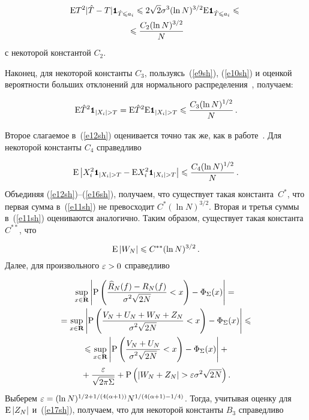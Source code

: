 \begin{multicols}{2}
\noindent
\begin{multline}
\mbox{E}T^2|\hat{T}-T|\mbox{{\small \tt {1}}\hspace{-1.5mm}{\tt 1}}_{\hat{T}\leqslant 
a_i}\leqslant2\sqrt{2}\sigma^3(\ln N)^{{3}/{2}}\mbox{E}\mbox{{\small \tt {1}}\hspace{-1.5mm}{\tt 1}}_{\hat{T}\leqslant 
a_i}\leqslant{}\\
{}\leqslant\displaystyle\frac{\displaystyle C_2(\ln N)^{{3}/{2}}\mathstrut}{\displaystyle N\mathstrut}\label{e14sh}
\end{multline}
с некоторой константой $C_2$.

Наконец, для некоторой константы $C_3$, пользуясь~(\ref{e9sh}), (\ref{e10sh}) 
и оценкой вероятности больших отклонений для нормального распределения~\cite{18sh}, получаем:

\noindent
\begin{equation}
\mbox{E}\hat{T}^2\Ik_{|X_i|> T}=\mbox{E}\hat{T}^2\mbox{E}\Ik_{|X_i|> T}\leqslant
\fr{C_3(\ln N)^{{1}/{2}}}{N}\,.\label{e15sh}
\end{equation}

Второе слагаемое в~(\ref{e12sh}) оценивается точно так же, как в работе~\cite{8sh}. 
Для некоторой константы $C_4$ справедливо

\noindent
\begin{equation}
\mbox{E}\abs{X_i^2\Ik_{|X_i|> T}-\mbox{E}X_i^2\Ik_{|X_i|> T}}\leqslant
\fr{C_4(\ln N)^{{1}/{2}}}{N}\,.\label{e16sh}
\end{equation}
Объединяя (\ref{e12sh})--(\ref{e16sh}), получаем, что существует такая константа~$C^*$, 
что первая сумма в~(\ref{e11sh}) не превосходит $C^*(\ln N)^{{3}/{2}}$. Вторая и 
третья суммы в~(\ref{e11sh}) оцениваются аналогично. Таким образом, существует такая 
константа $C^{**}$, что

\noindent
\begin{equation}
\mbox{E}\left\vert W_N\right\vert\leqslant C^{**}(\ln N)^{{3}/{2}}\,.\label{e17sh}
\end{equation}
Далее, для произвольного $\eps\hm>0$ справедливо

\noindent
\begin{multline*}
\sup\limits_{x\in\mathbf{R}}\left\vert\mbox{P}\left(\displaystyle\frac{\displaystyle \widehat{R}_N(f)-R_N(f)\mathstrut}{\displaystyle \sigma^2\sqrt{2N}\mathstrut}<x\right)-
\Phi_\Sigma(x)\right\vert={}\\
{}=\sup\limits_{x\in\mathbf{R}}\left\vert\mbox{P}
\left(\displaystyle\frac{\displaystyle V_N+U_N+W_N+Z_N\mathstrut}{\displaystyle \sigma^2\sqrt{2N}\mathstrut}<x\right)-\Phi_\Sigma(x)\right\vert\leqslant{}\hspace*{-0.7pt}\\
{}\leqslant\sup\limits_{x\in\mathbf{R}}\left\vert\mbox{P}\left(
\displaystyle\frac{\displaystyle V_N+U_N\mathstrut}{\displaystyle \sigma^2\sqrt{2N}\mathstrut}<x\right)- \Phi_\Sigma(x)\right\vert+{}\\
{}+\displaystyle\frac{\displaystyle \varepsilon\mathstrut}{\displaystyle \sqrt{2\pi\Sigma}\mathstrut}+
\mbox{P}\left(\left\vert W_N+Z_N\right\vert>\varepsilon\sigma^2\sqrt{2N}\right).
\end{multline*}
Выберем $\varepsilon=(\ln N)^{{1}/{2}+{1}/(4(\alpha+1))}N^{{1}/(4(\alpha+1)-{1}/{4})}$. 
Тогда, учитывая оценку для $\mbox{E}\left\vert Z_N\right\vert$ и~(\ref{e17sh}), 
получаем, что для некоторой константы $B_3$ справедливо


\end{multicols}
